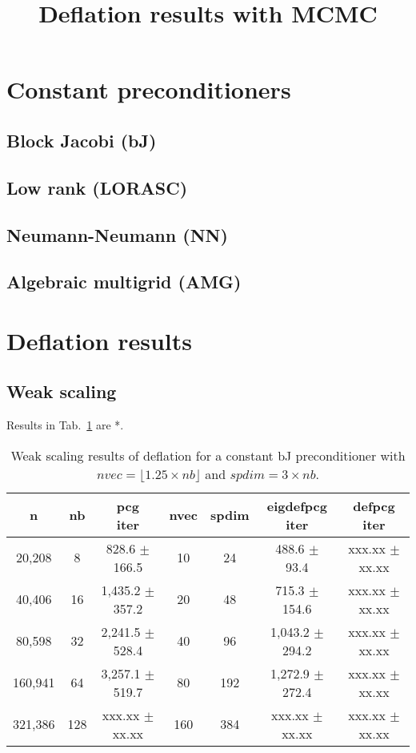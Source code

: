 \documentclass{article}
\title{Deflation results with MCMC}
\begin{document}
\maketitle

\section{Constant preconditioners}

\subsection{Block Jacobi (bJ)}

\subsection{Low rank (LORASC)}

\subsection{Neumann-Neumann (NN)}

\subsection{Algebraic multigrid (AMG)}

\section{Deflation results}

\subsection{Weak scaling}
Results in Tab.~\ref{Tab:005} are *.


\begin{table}[ht]
	\caption{Weak scaling results of deflation for a constant bJ preconditioner with $nvec=\lfloor1.25\times nb\rfloor$ and $spdim=3\times nb$.}
	\centering
	\begin{tabular}{|c|c|c|c|c|c|c|}
		\hline
		n & nb & \makecell{pcg\\ iter} & nvec & spdim & \makecell{eigdefpcg\\ iter} & \makecell{defpcg\\ iter}\\
		\hline
		20,208  &   8 &   828.6 $\pm$ 166.5 &  10 &  24 &   488.6 $\pm$  93.4 & xxx.xx $\pm$ xx.xx \\
		40,406  &  16 & 1,435.2 $\pm$ 357.2 &  20 &  48 &   715.3 $\pm$ 154.6 & xxx.xx $\pm$ xx.xx \\
		80,598  &  32 & 2,241.5 $\pm$ 528.4 &  40 &  96 & 1,043.2 $\pm$ 294.2 & xxx.xx $\pm$ xx.xx \\
		160,941 &  64 & 3,257.1 $\pm$ 519.7 &  80 & 192 & 1,272.9 $\pm$ 272.4   & xxx.xx $\pm$ xx.xx \\
		321,386 & 128 & xxx.xx $\pm$ xx.xx & 160 & 384 & xxx.xx $\pm$ xx.xx & xxx.xx $\pm$ xx.xx \\
		\hline
	\end{tabular}
	\label{Tab:005}
\end{table}
\end{document}
